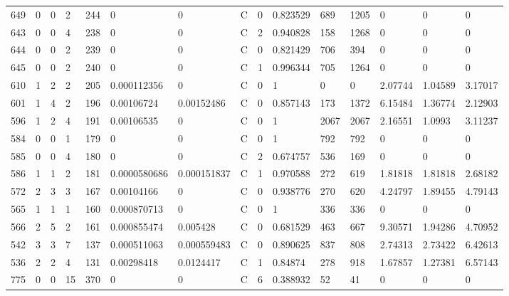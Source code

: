 \begin{latin}
\begin{longtable}{lllllllllllllll}
	649 & 0  & 0   & 2  & 244 & 0              & 0              & C & 0  & 0.823529 & 689  & 1205 & 0       & 0       & 0       \\
	643 & 0  & 0   & 4  & 238 & 0              & 0              & C & 2  & 0.940828 & 158  & 1268 & 0       & 0       & 0       \\
	644 & 0  & 0   & 2  & 239 & 0              & 0              & C & 0  & 0.821429 & 706  & 394  & 0       & 0       & 0       \\
	645 & 0  & 0   & 2  & 240 & 0              & 0              & C & 1  & 0.996344 & 705  & 1264 & 0       & 0       & 0       \\
	610 & 1  & 2   & 2  & 205 & 0.000112356    & 0              & C & 0  & 1        & 0    & 0    & 2.07744 & 1.04589 & 3.17017 \\
	601 & 1  & 4   & 2  & 196 & 0.00106724     & 0.00152486     & C & 0  & 0.857143 & 173  & 1372 & 6.15484 & 1.36774 & 2.12903 \\
	596 & 1  & 2   & 4  & 191 & 0.00106535     & 0              & C & 0  & 1        & 2067 & 2067 & 2.16551 & 1.0993  & 3.11237 \\
	584 & 0  & 0   & 1  & 179 & 0              & 0              & C & 0  & 1        & 792  & 792  & 0       & 0       & 0       \\
	585 & 0  & 0   & 4  & 180 & 0              & 0              & C & 2  & 0.674757 & 536  & 169  & 0       & 0       & 0       \\
	586 & 1  & 1   & 2  & 181 & 0.0000580686   & 0.000151837    & C & 1  & 0.970588 & 272  & 619  & 1.81818 & 1.81818 & 2.68182 \\
	572 & 2  & 3   & 3  & 167 & 0.00104166     & 0              & C & 0  & 0.938776 & 270  & 620  & 4.24797 & 1.89455 & 4.79143 \\
	565 & 1  & 1   & 1  & 160 & 0.000870713    & 0              & C & 0  & 1        & 336  & 336  & 0       & 0       & 0       \\
	566 & 2  & 5   & 2  & 161 & 0.000855474    & 0.005428       & C & 0  & 0.681529 & 463  & 667  & 9.30571 & 1.94286 & 4.70952 \\
	542 & 3  & 3   & 7  & 137 & 0.000511063    & 0.000559483    & C & 0  & 0.890625 & 837  & 808  & 2.74313 & 2.73422 & 6.42613 \\
	536 & 2  & 2   & 4  & 131 & 0.00298418     & 0.0124417      & C & 1  & 0.84874  & 278  & 918  & 1.67857 & 1.27381 & 6.57143 \\
	775 & 0  & 0   & 15 & 370 & 0              & 0              & C & 6  & 0.388932 & 52   & 41   & 0       & 0       & 0       \\

\end{longtable}
\end{latin}
